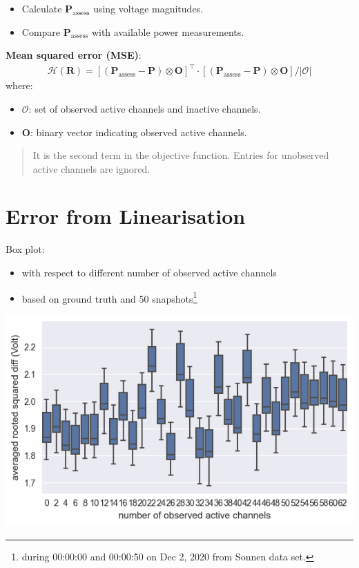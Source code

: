 \documentclass[
]{book}
\providecommand{\tightlist}{%
  \setlength{\itemsep}{0pt}\setlength{\parskip}{0pt}}
\begin{document}
\begin{itemize}
\tightlist
\item
  Calculate \(\boldsymbol{P}_\text{assess}\) using voltage magnitudes.
\item
  Compare \(\boldsymbol{P}_\text{assess}\) with available power measurements.
\end{itemize}

\textbf{Mean squared error (MSE)}:
\[ \begin{aligned}
  \mathcal{H}(\boldsymbol{R}) =
  \left[
    (\boldsymbol{P}_\text{assess} - \boldsymbol{P})
    \otimes \boldsymbol{O}
  \right]^\top
  \cdot \left[
    (\boldsymbol{P}_\text{assess} - \boldsymbol{P})
    \otimes \boldsymbol{O}
  \right]
  / |\mathcal{O}|
\end{aligned} \]
where:

\begin{itemize}
\tightlist
\item
  \(\mathcal{O}\): set of observed active channels and inactive channels.
\item
  \(\boldsymbol{O}\): binary vector indicating observed active channels.
\end{itemize}

\begin{quote}
It is the second term in the objective function. Entries for unobserved
active channels are ignored.
\end{quote}

\hypertarget{error}{%
\section{Error from Linearisation}\label{error}}

Box plot:

\begin{itemize}
\tightlist
\item
  with respect to different number of observed active channels
\item
  based on ground truth and 50 snapshots\footnote{during 00:00:00 and 00:00:50 on Dec
    2, 2020 from Sonnen data set.}
\end{itemize}

\begin{center}\includegraphics{Pictures/figErrorObsBRM} \end{center}
\end{document}
